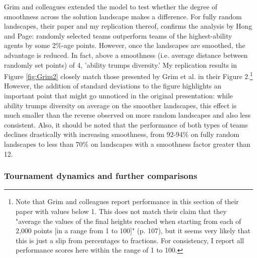  Grim and colleagues extended the model to test whether the degree of smoothness across the solution landscape makes a difference. For fully random landscapes, their paper and my replication thereof, confirms the analysis by Hong and Page: randomly selected teams outperform teams of the highest-ability agents by some 2\%-age points. However, once the landscapes are smoothed, the advantage is reduced. In fact, above a smoothness (i.e. average distance between randomly set points) of 4, 'ability trumps diversity.' My replication results in Figure \ref{fig:Grim2} closely match those presented by Grim et al. in their Figure 2.\footnote{Note that Grim and colleagues report performance in this section of their paper with values below 1. This does not match their claim that they "average the values of the final heights reached when starting from each of 2,000 points [in a range from 1 to 100]" (p. 107), but it seems very likely that this is just a slip from percentages to fractions. For consistency, I report all performance scores here within the range of 1 to 100.} However, the addition of standard deviations to the figure highlights an important point that might go unnoticed in the original presentation: while ability trumps diversity on average on the smoother landscapes, this effect is much smaller than the reverse observed on more random landscapes and also less consistent. Also, it should be noted that the performance of both types of teams declines drastically with increasing smoothness, from 92-94\% on fully random landscapes to less than 70\% on landscapes with a smoothness factor greater than 12.
 
 \subsubsection{Tournament dynamics and further comparisons}
 
